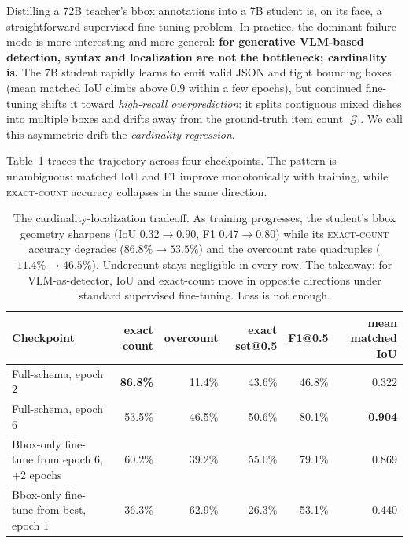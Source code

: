 Distilling a 72B teacher's bbox annotations into a 7B student is, on its face,
a straightforward supervised fine-tuning problem. In practice, the dominant
failure mode is more interesting and more general: \textbf{for generative
VLM-based detection, syntax and localization are not the bottleneck;
cardinality is.} The 7B student rapidly learns to emit valid JSON and tight
bounding boxes (mean matched IoU climbs above $0.9$ within a few epochs), but
continued fine-tuning shifts it toward \emph{high-recall overprediction}: it
splits contiguous mixed dishes into multiple boxes and drifts away from the
ground-truth item count $|\mathcal{G}|$. We call this asymmetric drift the
\emph{cardinality regression}.

Table~\ref{tab:card-trajectory} traces the trajectory across four
checkpoints. The pattern is unambiguous: matched IoU and F1 improve
monotonically with training, while \textsc{exact-count} accuracy collapses
in the same direction.

\begin{table}[t]
\centering\small
\begin{tabular}{lrrrrr}
\toprule
\textbf{Checkpoint}                                     & \textbf{exact count} & \textbf{overcount} & \textbf{exact set@0.5} & \textbf{F1@0.5} & \textbf{mean matched IoU} \\
\midrule
Full-schema, epoch 2                                    & \textbf{86.8\%}  & 11.4\%  & 43.6\% & 46.8\% & 0.322 \\
Full-schema, epoch 6                                    & 53.5\%  & 46.5\%  & 50.6\% & 80.1\% & \textbf{0.904} \\
Bbox-only fine-tune from epoch 6, $+$2 epochs           & 60.2\%  & 39.2\%  & 55.0\% & 79.1\% & 0.869 \\
Bbox-only fine-tune from best, epoch 1                  & 36.3\%  & 62.9\%  & 26.3\% & 53.1\% & 0.440 \\
\bottomrule
\end{tabular}
\caption{The cardinality-localization tradeoff. As training progresses, the
student's bbox geometry sharpens (IoU $0.32 \rightarrow 0.90$, F1
$0.47 \rightarrow 0.80$) while its \textsc{exact-count} accuracy degrades
($86.8\% \rightarrow 53.5\%$) and the overcount rate quadruples
($11.4\% \rightarrow 46.5\%$). Undercount stays negligible in every row.
The takeaway: for VLM-as-detector, IoU and exact-count move in opposite
directions under standard supervised fine-tuning. Loss is not enough.}
\label{tab:card-trajectory}
\end{table}

